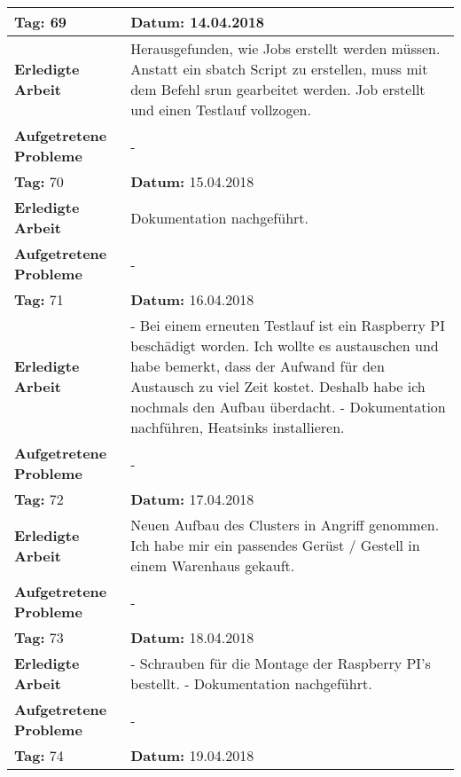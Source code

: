 \begin{longtable}{|p{5cm}|p{5cm}p{6cm}|}
\rowcolor{heading}\textbf{Tag:} 69 & \textbf{Datum:} 14.04.2018 & \\ \hline
\textbf{Erledigte Arbeit} & \multicolumn{2}{p{11cm}|}{Herausgefunden, wie Jobs erstellt werden müssen. Anstatt ein sbatch Script zu erstellen, muss mit dem Befehl srun gearbeitet werden. Job erstellt und einen Testlauf vollzogen.} \\ \hline
\textbf{Aufgetretene Probleme} & \multicolumn{2}{p{11cm}|}{-} \\ \hline
\rowcolor{heading}\textbf{Tag:} 70 & \textbf{Datum:} 15.04.2018 & \\ \hline
\textbf{Erledigte Arbeit} & \multicolumn{2}{p{11cm}|}{Dokumentation nachgeführt.} \\ \hline
\textbf{Aufgetretene Probleme \newline } & \multicolumn{2}{p{11cm}|}{-} \\ \hline
\rowcolor{heading}\textbf{Tag:} 71 & \textbf{Datum:} 16.04.2018 & \\ \hline
\textbf{Erledigte Arbeit} & \multicolumn{2}{p{11cm}|}{- Bei einem erneuten Testlauf ist ein Raspberry PI beschädigt worden. Ich wollte es austauschen und habe bemerkt, dass der Aufwand für den Austausch zu viel Zeit kostet. Deshalb habe ich nochmals den Aufbau überdacht. \newline 
- Dokumentation nachführen, Heatsinks installieren.} \\ \hline
\textbf{Aufgetretene Probleme} & \multicolumn{2}{p{11cm}|}{-} \\ \hline
\rowcolor{heading}\textbf{Tag:} 72 & \textbf{Datum:} 17.04.2018 & \\ \hline
\textbf{Erledigte Arbeit} & \multicolumn{2}{p{11cm}|}{Neuen Aufbau des Clusters in Angriff genommen. Ich habe mir ein passendes Gerüst / Gestell in einem Warenhaus gekauft. } \\ \hline
\textbf{Aufgetretene Probleme} & \multicolumn{2}{p{11cm}|}{-} \\ \hline
\rowcolor{heading}\textbf{Tag:} 73 & \textbf{Datum:} 18.04.2018 & \\ \hline
\textbf{Erledigte Arbeit} & \multicolumn{2}{p{11cm}|}{- Schrauben für die Montage der Raspberry PI's bestellt. \newline
- Dokumentation nachgeführt.} \\ \hline
\textbf{Aufgetretene Probleme} & \multicolumn{2}{p{11cm}|}{-} \\ \hline
\rowcolor{heading}\textbf{Tag:} 74 & \textbf{Datum:} 19.04.2018 & \\ \hline

\end{longtable}
